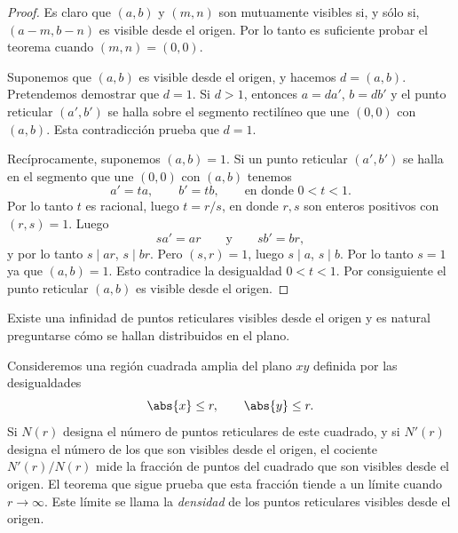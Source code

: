 \documentclass[12pt,a4paper]{book}
\begin{document}
    \begin{proof}
        Es claro que $(a,b)$ y $(m,n)$ son mutuamente visibles si, y sólo si,
        $(a-m,b-n)$ es visible desde el origen. Por lo tanto es suficiente probar el
        teorema cuando $(m,n)=(0,0)$.

        Suponemos que $(a,b)$ es visible desde el origen, y hacemos $d=(a,b)$. Pretendemos
        demostrar que $d=1$. Si $d>1$, entonces $a=da'$, $b=db'$ y el punto reticular
        $(a',b')$ se halla sobre el segmento rectilíneo que une $(0,0)$ con $(a,b)$. Esta
        contradicción prueba que $d=1$.

        Recíprocamente, suponemos $(a,b)=1$. Si un punto reticular $(a',b')$ se halla en el
        segmento que une $(0,0)$ con $(a,b)$ tenemos
        \begin{equation*}
            a'=ta,\qquad b'=tb,\qquad\text{en donde } 0<t<1.
        \end{equation*}
        Por lo tanto $t$ es racional, luego $t=r/s$, en donde $r,s$ son enteros positivos
        con $(r,s)=1$. Luego
        \begin{equation*}
            sa'=ar\qquad\text{y}\qquad sb'=br,
        \end{equation*}
        y por lo tanto $s\mid ar$, $s\mid br$. Pero $(s,r)=1$, luego $s\mid a$, $s\mid b$.
        Por lo tanto $s=1$ ya que $(a,b)=1$. Esto contradice la desigualdad $0<t<1$. Por
        consiguiente el punto reticular $(a,b)$ es visible desde el origen.
    \end{proof}

    Existe una infinidad de puntos reticulares visibles desde el origen y es natural
    preguntarse cómo se hallan distribuidos en el plano.

    Consideremos una región cuadrada amplia del plano $xy$ definida por las desigualdades
    \begin{equation*}
        \abs{x}\leq r,\qquad\abs{y}\leq r.
    \end{equation*}
    Si $N(r)$ designa el número de puntos reticulares de este cuadrado, y si $N'(r)$
    designa el número de los que son visibles desde el origen, el cociente $N'(r)/N(r)$
    mide la fracción de puntos del cuadrado que son visibles desde el origen. El teorema
    que sigue prueba que esta fracción tiende a un límite cuando $r\to\infty$. Este límite
    se llama la \textit{densidad} de los puntos reticulares visibles desde el origen.
\end{document}
